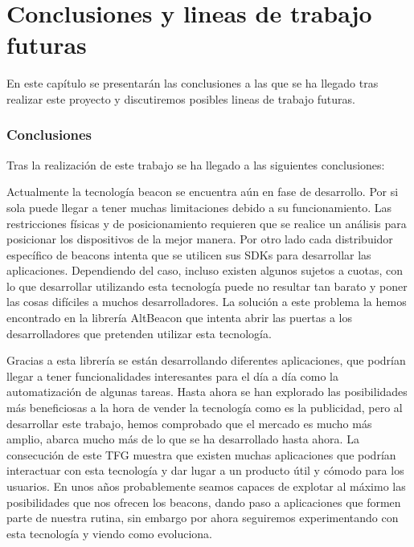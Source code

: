 %
%
%

\chapter{Conclusiones y lineas de trabajo futuras} \label{chap:Conclusiones} 

En este capítulo se presentarán las conclusiones a las que se ha llegado tras realizar este proyecto y discutiremos posibles lineas de trabajo futuras.

\subsection{Conclusiones}

Tras la realización de este trabajo se ha llegado a las siguientes conclusiones: 


Actualmente la tecnología beacon se encuentra aún en fase de desarrollo. Por si sola puede llegar a tener muchas limitaciones debido a su funcionamiento. Las restricciones físicas y de posicionamiento requieren que se realice un análisis para posicionar los dispositivos de la mejor manera. Por otro lado cada distribuidor específico de beacons intenta que se utilicen sus SDKs para desarrollar las aplicaciones. Dependiendo del caso, incluso existen algunos sujetos a cuotas, con lo que desarrollar utilizando esta tecnología puede no resultar tan barato y poner las cosas difíciles a muchos desarrolladores. La solución a este problema la hemos encontrado en la librería AltBeacon que intenta abrir las puertas a los desarrolladores que pretenden utilizar esta tecnología.


Gracias a esta librería se están desarrollando diferentes aplicaciones, que podrían llegar a tener funcionalidades interesantes para el día a día como la automatización de algunas tareas. Hasta ahora se han explorado las posibilidades más beneficiosas a la hora de vender la tecnología como es la publicidad, pero al desarrollar este trabajo, hemos comprobado que el mercado es mucho más amplio, abarca mucho más de lo que se ha desarrollado hasta ahora. La consecución de este TFG muestra que existen muchas aplicaciones que podrían interactuar con esta tecnología y dar lugar a un producto útil y cómodo para los usuarios. En unos años probablemente seamos capaces de explotar al máximo las posibilidades que nos ofrecen los beacons, dando paso a aplicaciones que formen parte de nuestra rutina, sin embargo por ahora seguiremos experimentando con esta tecnología y viendo como evoluciona.


